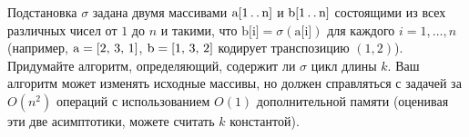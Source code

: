 \documentclass{article}
\begin{document}
Подстановка $\sigma$ задана двумя массивами $\text{a[1\,.\,.\,n]}$ и $\text{b[1\,.\,.\,n]}$ состоящими из всех различных чисел от $1$ до $n$ и такими, что $\text{b[i]} = \sigma (\text{a[i]})$ для каждого $i = 1,\ldots,n$ (например, $\text{a} = \text{[2,\,\,3,\,\,1]}$, $\text{b} = \text{[1,\,\,3,\,\,2]}$ кодирует транспозицию $(1,2)$). Придумайте алгоритм, определяющий, содержит ли $\sigma$ цикл длины $k$. Ваш алгоритм может изменять исходные массивы, но должен справляться с задачей за $O(n^2)$ операций с использованием $O(1)$ дополнительной памяти (оценивая эти две асимптотики, можете считать $k$ константой).
\end{document}

